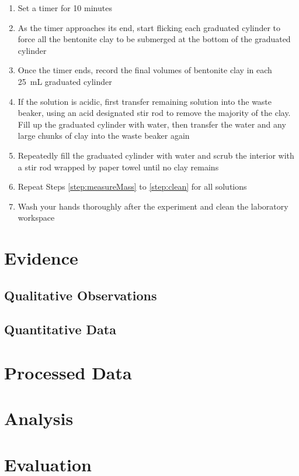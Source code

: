 \documentclass[11pt, letterpaper]{article}
\begin{document}
\begin{enumerate}
    \item Set a timer for 10 minutes
    \item As the timer approaches its end, start flicking each graduated cylinder to force all the bentonite clay to be submerged at the bottom of the graduated cylinder
    \item Once the timer ends, record the final volumes of bentonite clay in each \SI{25}{mL} graduated cylinder
    \item If the solution is acidic, first transfer remaining solution into the waste beaker, using an acid designated stir rod to remove the majority of the clay. Fill up the graduated cylinder with water, then transfer the water and any large chunks of clay into the waste beaker again
    \item \label{step:clean} Repeatedly fill the graduated cylinder with water and scrub the interior with a stir rod wrapped by paper towel until no clay remains
    \item Repeat Steps \ref*{step:measureMass} to \ref*{step:clean} for all solutions
    \item Wash your hands thoroughly after the experiment and clean the laboratory workspace
\end{enumerate}

\section{Evidence}
\subsection{Qualitative Observations}
\subsection{Quantitative Data}

\section{Processed Data}

\section{Analysis}

\section{Evaluation}




\end{document}
